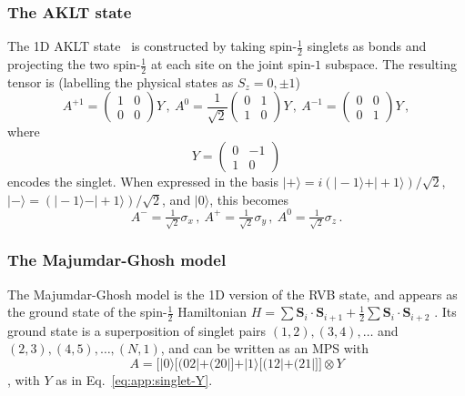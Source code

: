 \documentclass[rmp,aps,reprint,superscriptaddress,nobalancelastpage]{revtex4-1}
\newcommand{\ket}[1]{\vert#1\rangle}
\begin{document}
    \subsubsection{The AKLT state} The 1D AKLT state~\cite*{affleck:aklt-prl} is  constructed by taking spin-$\tfrac12$ singlets as bonds and projecting the two spin-$\tfrac12$ at each site on the joint spin-$1$ subspace. The resulting tensor is (labelling the physical states as $S_z=0,\pm1$)
    \[
        A^{+1}=\begin{pmatrix}1&0\\0&0\end{pmatrix}Y\,,
        \
        A^{0}=\frac{1}{\sqrt{2}}\begin{pmatrix}0&1\\1&0\end{pmatrix}Y\,,
        \
        A^{-1}=\begin{pmatrix}0&0\\0&1\end{pmatrix}Y\,,
    \]
    where
    \begin{equation}
        \label{eq:app:singlet-Y}
        Y=\left(\begin{matrix}0&-1\\1&0\end{matrix}\right)
    \end{equation}
    encodes the singlet.
    When expressed in the basis $\ket{+}=i(\ket{-1}+\ket{+1})/\sqrt{2}$,
$\ket{-}=(\ket{-1}-\ket{+1})/\sqrt{2}$,
    and $\ket0$, this becomes
    \[
        A^{-} = \tfrac{1}{\sqrt{2}}\sigma_x\,,\
        A^{+} = \tfrac{1}{\sqrt{2}}\sigma_y\,,\
        A^{0} = \tfrac{1}{\sqrt{2}}\sigma_z\,.
    \]



    \subsubsection{The Majumdar-Ghosh model} The Majumdar-Ghosh model
    is the 1D version of the RVB state, and appears as the ground state of the spin-$\tfrac12$
    Hamiltonian $H=\sum \bm S_i\cdot \bm S_{i+1} + \tfrac12
\sum \bm S_i\cdot \bm S_{i+2}$
    \cite{majumdar:majumdar-ghosh-model}. Its ground state is a superposition of singlet pairs $(1,2),(3,4),\dots$ and $(2,3),(4,5),\dots,(N,1)$, and can be written as an MPS with
    \[
        A = \Big[\ket0\big[(02|+(20|\big] + \ket1\big[(12|+(21|\big]\Big]\otimes Y
    \]
    \cite{verstraete:comp-power-of-peps}, with $Y$ as in Eq.~\eqref{eq:app:singlet-Y}.
\end{document}
